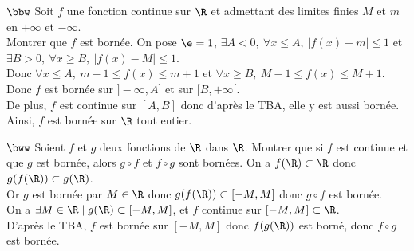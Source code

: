 \documentclass[11pt]{article}
\begin{document}
\begin{exercice}{$\bbw$}{}
    Soit $f$ une fonction continue sur $\R$ et admettant des limites finies $M$ et $m$ en $+\infty$ et $-\infty$.\\
    Montrer que $f$ est bornée.
    \tcblower
    On pose $\e=1$, $\exists A<0,~\forall x \leq A, ~ |f(x)-m|\leq 1$ et $\exists B > 0, ~ \forall x \geq B, ~ |f(x)-M|\leq1$.\\
    Donc $\forall x \leq A, ~ m-1 \leq f(x) \leq m+1$ et $\forall x \geq B, ~ M-1\leq f(x) \leq M+1$.\\
    Donc $f$ est bornée sur $]-\infty, A]$ et sur $[B,+\infty[$.\\
    De plus, $f$ est continue sur $[A,B]$ donc d'après le TBA, elle y est aussi bornée.\\
    Ainsi, $f$ est bornée sur $\R$ tout entier.
\end{exercice}

\begin{exercice}{$\bww$}{}
    Soient $f$ et $g$ deux fonctions de $\R$ dans $\R$. Montrer que si $f$ est continue et que $g$ est bornée, alors $g\circ f$ et $f\circ g$ sont bornées.
    \tcblower
     On a $f(\R)\subset\R$ donc $g(f(\R))\subset g(\R)$.\\
    Or $g$ est bornée par $M\in\R$ donc $g(f(\R))\subset[-M,M]$ donc $g\circ f$ est bornée.\\
     On a $\exists M\in\R \mid g(\R)\subset[-M,M]$, et $f$ continue sur $[-M,M]\subset\R$.\\
    D'après le TBA, $f$ est bornée sur $[-M,M]$ donc $f(g(\R))$ est borné, donc $f\circ g$ est bornée.
\end{exercice}
\end{document}
